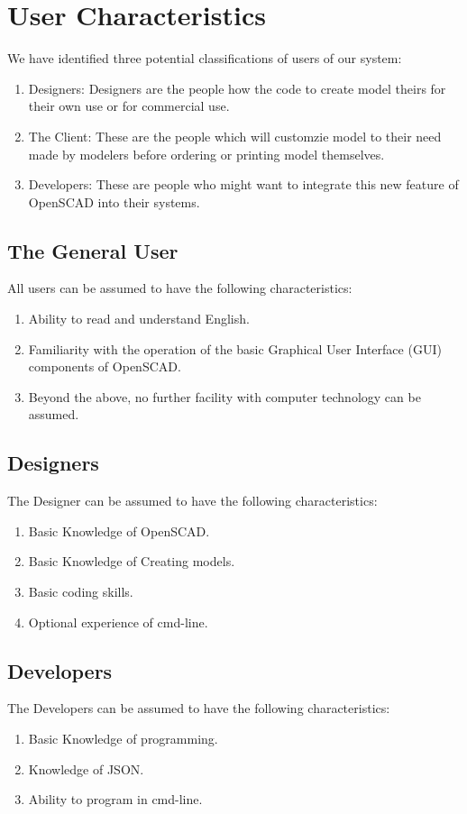 \section{User Characteristics}

We have identified three potential classifications of users of our system:

\begin{enumerate}
    \item Designers: Designers are the people how the code to create model theirs for their own use or for commercial use.
    \item The Client: These are the people which will customzie model to their need made by modelers before ordering or printing model themselves.
    \item Developers: These are people who might want to integrate this new feature of OpenSCAD into their systems.
   
\end{enumerate}

\subsection{The General User}

All users can be assumed to have the following characteristics:

\begin{enumerate}
    \item Ability to read and understand English.
    \item Familiarity with the operation of the basic Graphical User Interface (GUI) components of OpenSCAD.
    \item Beyond the above, no further facility with computer technology can be assumed.
\end{enumerate}

\subsection{Designers}
The Designer can be assumed to have the following characteristics:
\begin{enumerate}
    \item Basic Knowledge of OpenSCAD.
    \item Basic Knowledge of Creating models.
    \item Basic coding skills.
    \item Optional experience of cmd-line.
\end{enumerate}

\subsection{Developers}
The Developers can be assumed to have the following characteristics:
\begin{enumerate}
    \item Basic Knowledge of programming.
    \item Knowledge of JSON.
    \item Ability to program in cmd-line.
\end{enumerate}
